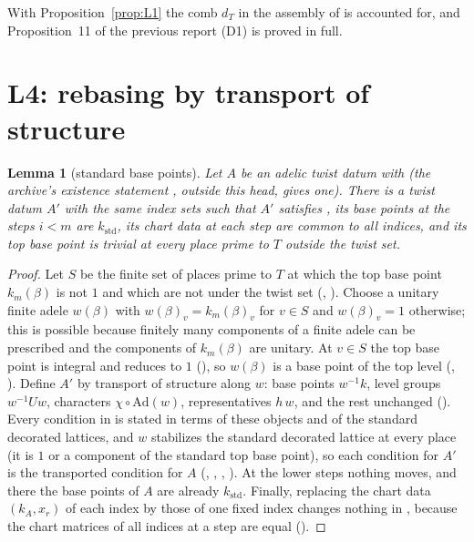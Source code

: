 \documentclass[11pt]{article}
\newtheorem{lemma}[theorem]{Lemma}
\theoremstyle{definition}
\theoremstyle{remark}
\begin{document}
With Proposition~\ref{prop:L1} the comb $d_T$ in the assembly of  is accounted for, and Proposition~11 of the previous report (D1) is proved in full.

\section{L4: rebasing by transport of structure}\label{sec:L4}

\begin{lemma}[standard base points]\label{lem:L4}
Let $A$ be an adelic twist datum with  (the archive's existence statement , outside this head, gives one). There is a twist datum $A'$ with the same index sets such that $A'$ satisfies , its base points at the steps $i<m$ are $k_{\mathrm{std}}$, its chart data at each step are common to all indices, and its top base point is trivial at every place prime to $T$ outside the twist set.
\end{lemma}

\begin{proof}
Let $S$ be the finite set of places prime to $T$ at which the top base point $k_m(\beta)$ is not $1$ and which are not under the twist set (, ). Choose a unitary finite adele $w(\beta)$ with $w(\beta)_v=k_m(\beta)_v$ for $v\in S$ and $w(\beta)_v=1$ otherwise; this is possible because finitely many components of a finite adele can be prescribed and the components of $k_m(\beta)$ are unitary. At $v\in S$ the top base point is integral and reduces to $1$ (), so $w(\beta)$ is a base point of the top level (, ). Define $A'$ by transport of structure along $w$: base points $w^{-1}k$, level groups $w^{-1}Uw$, characters $\chi\circ\mathrm{Ad}(w)$, representatives $h\,w$, and the rest unchanged (). Every condition in  is stated in terms of these objects and of the standard decorated lattices, and $w$ stabilizes the standard decorated lattice at every place (it is $1$ or a component of the standard top base point), so each condition for $A'$ is the transported condition for $A$ (, , , ). At the lower steps nothing moves, and there the base points of $A$ are already $k_{\mathrm{std}}$. Finally, replacing the chart data $(k_A,x_r)$ of each index by those of one fixed index changes nothing in , because the chart matrices of all indices at a step are equal ().
\end{proof}
\end{document}
